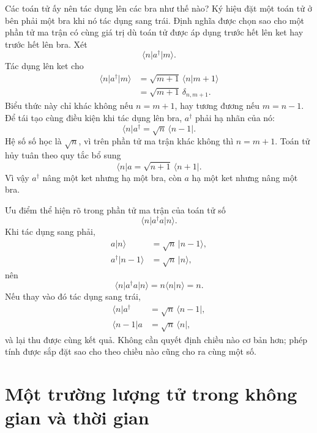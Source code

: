 Các toán tử ấy nên tác dụng lên các bra như thế nào? Ký hiệu đặt một toán tử ở bên phải một bra khi nó tác dụng sang trái. Định nghĩa được chọn sao cho một phần tử ma trận có cùng giá trị dù toán tử được áp dụng trước hết lên ket hay trước hết lên bra. Xét
\begin{equation}
\langle n\rvert a^\dagger\lvert m\rangle.
\end{equation}
Tác dụng lên ket cho
\begin{align}
\langle n\rvert a^\dagger\lvert m\rangle
&=\sqrt{m+1}\,\langle n\vert m+1\rangle\\
&=\sqrt{m+1}\,\delta_{n,m+1}.
\end{align}
Biểu thức này chỉ khác không nếu \(n=m+1\), hay tương đương nếu \(m=n-1\). Để tái tạo cùng điều kiện khi tác dụng lên bra, \(a^\dagger\) phải hạ nhãn của nó:
\begin{equation}
\langle n\rvert a^\dagger
=\sqrt n\,\langle n-1\rvert.
\end{equation}
Hệ số số học là \(\sqrt n\), vì trên phần tử ma trận khác không thì \(n=m+1\). Toán tử hủy tuân theo quy tắc bổ sung
\begin{equation}
\langle n\rvert a
=\sqrt{n+1}\,\langle n+1\rvert.
\end{equation}
Vì vậy \(a^\dagger\) nâng một ket nhưng hạ một bra, còn \(a\) hạ một ket nhưng nâng một bra.

Ưu điểm thể hiện rõ trong phần tử ma trận của toán tử số
\begin{equation}
\langle n\rvert a^\dagger a\lvert n\rangle.
\end{equation}
Khi tác dụng sang phải,
\begin{align}
a\lvert n\rangle&=\sqrt n\,\lvert n-1\rangle,\\
a^\dagger\lvert n-1\rangle&=\sqrt n\,\lvert n\rangle,
\end{align}
nên
\begin{equation}
\langle n\rvert a^\dagger a\lvert n\rangle
=n\langle n\vert n\rangle=n.
\end{equation}
Nếu thay vào đó tác dụng sang trái,
\begin{align}
\langle n\rvert a^\dagger&=\sqrt n\,\langle n-1\rvert,\\
\langle n-1\rvert a&=\sqrt n\,\langle n\rvert,
\end{align}
và lại thu được cùng kết quả. Không cần quyết định chiều nào cơ bản hơn; phép tính được sắp đặt sao cho theo chiều nào cũng cho ra cùng một số.

\section{Một trường lượng tử trong không gian và thời gian}

